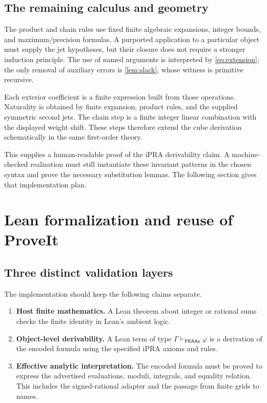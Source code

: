 \subsection{The remaining calculus and geometry}

The product and chain rules use fixed finite algebraic expansions,
integer bounds, and maximum/precision formulas. A purported application
to a particular object must supply the jet hypotheses, but their
closure does not require a stronger induction principle.
The use of named arguments is interpreted by
\eqref{eq:extension}; the only removal of auxiliary errors is
\cref{lem:slack}, whose witness is primitive recursive.

Each exterior coefficient is a finite expression built from those
operations. Naturality is obtained by finite expansion, product rules,
and the supplied symmetric second jets. The chain step is a finite
integer linear combination with the displayed weight shift.
These steps therefore extend the cube derivation schematically in the
same first-order theory.

This supplies a human-readable proof of the iPRA derivability claim.
A machine-checked realization must still instantiate these invariant
patterns in the chosen syntax and prove the necessary substitution
lemmas. The following section gives that implementation plan.

\section{Lean formalization and reuse of ProveIt}\label{sec:lean}

\subsection{Three distinct validation layers}

The implementation should keep the following claims separate.

\begin{enumerate}
\item \textbf{Host finite mathematics.} A Lean theorem about integer or
rational sums checks the finite identity in Lean's ambient logic.
\item \textbf{Object-level derivability.} A Lean term of type
$\Gamma\vdash_{\mathsf{PRAAx}}\varphi$ is a derivation of the encoded
formula using the specified iPRA axioms and rules.
\item \textbf{Effective analytic interpretation.} The encoded formula
must be proved to express the advertised evaluations, moduli,
integrals, and equality relation. This includes the signed-rational
adapter and the passage from finite grids to names.
\end{enumerate}

